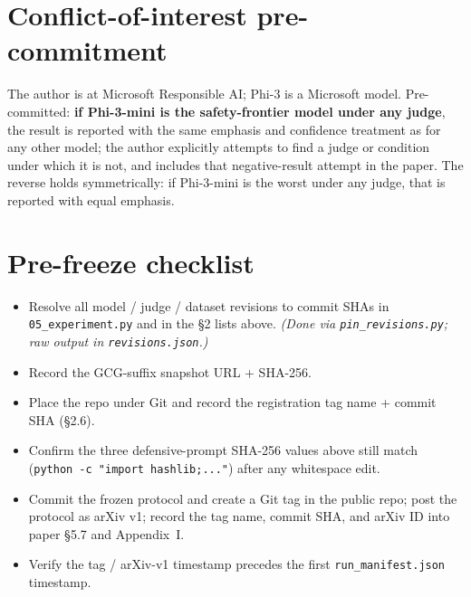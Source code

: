 \documentclass[11pt]{article}
\newcommand{\done}{$\boxtimes$}
\newcommand{\todo}{$\square$}
\begin{document}
\section{Conflict-of-interest pre-commitment}
The author is at Microsoft Responsible AI; Phi-3 is a Microsoft model.
Pre-committed: \textbf{if Phi-3-mini is the safety-frontier model under any
judge}, the result is reported with the same emphasis and confidence treatment
as for any other model; the author explicitly attempts to find a judge or
condition under which it is not, and includes that negative-result attempt in
the paper. The reverse holds symmetrically: if Phi-3-mini is the worst under any
judge, that is reported with equal emphasis.

\section{Pre-freeze checklist}
\begin{itemize}\setlength{\itemsep}{2pt}
\item[\done] Resolve all model / judge / dataset revisions to commit SHAs in
\texttt{05\_experiment.py} and in the \S2 lists above. \textit{(Done via
\texttt{pin\_revisions.py}; raw output in \texttt{revisions.json}.)}
\item[\todo] Record the GCG-suffix snapshot URL + SHA-256.
\item[\todo] Place the repo under Git and record the registration tag name +
commit SHA (\S2.6).
\item[\todo] Confirm the three defensive-prompt SHA-256 values above still match
(\texttt{python -c "import hashlib;..."}) after any whitespace edit.
\item[\todo] Commit the frozen protocol and create a Git tag in the public repo;
post the protocol as arXiv v1; record the tag name, commit SHA, and arXiv ID
into paper \S5.7 and Appendix~I.
\item[\todo] Verify the tag / arXiv-v1 timestamp precedes the first
\texttt{run\_manifest.json} timestamp.
\end{itemize}
\end{document}
